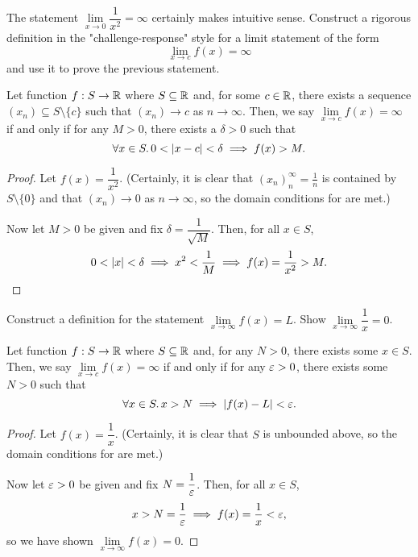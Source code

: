 \begin{problem}
  The statement $\lim\limits_{x \to 0} \dfrac{1}{x^{2}} = \infty$ certainly makes
  intuitive sense. Construct a rigorous definition in the "challenge-response"
  style for a limit statement of the form
    \[
      \lim_{x \to c} f(x) = \infty
    \]
  and use it to prove the previous statement.

  \begin{definition}
    \label{def:limit-to-infty-x-to-finite-real}
    Let function $f : S \to \mathbb{R}$ where $S \subseteq \mathbb{R}$ and, for some $c \in \mathbb{R}$, there exists a
    sequence $(x_{n}) \subseteq S \setminus \{ c \}$ such that $(x_{n}) \to c$ as $n \to \infty$.
    Then, we say $\lim\limits_{x \to c} f(x) = \infty$ if and only if for any
    $M > 0$, there exists a $\delta > 0$ such that
    \[
      \forall x \in S.\, 0 < \left\lvert x - c \right\rvert < \delta \implies f(x) > M.
    \]
  \end{definition}

  \begin{proof}
    Let $f(x) = \dfrac{1}{x^{2}}$. (Certainly, it is clear that
    $(x_{n})_{n}^{\infty} = \frac{1}{n}$ is contained by $S \setminus \{ 0 \}$
    and that $(x_{n}) \to 0$ as $n \to \infty$, so the domain conditions for 
     are met.)

    Now let $M > 0$ be given and fix $\delta = \dfrac{1}{\sqrt{M}}$. 
    Then, for all $x \in S$,
    \[
      0 < \left\lvert x \right\rvert < \delta \implies x^{2} < \frac{1}{M} \implies  f(x) = \frac{1}{x^{2}} > M.
    \]
  \end{proof}

\end{problem}

\begin{problem}
  Construct a definition for the statement $\lim\limits_{x \to \infty} f(x) = L$.
  Show $\lim\limits_{x \to \infty} \dfrac{1}{x} = 0$.

  \begin{definition}
    \label{def:limit-to-finite-real-x-to-infinite}
    Let function $f : S \to \mathbb{R}$ where $S \subseteq \mathbb{R}$ and, for any $N > 0$, there 
    exists some $x \in S$.
    Then, we say $\lim\limits_{x \to c} f(x) = \infty$ if and only if for any
    $\varepsilon > 0$, there exists some $N > 0$ such that
    \[
      \forall x \in S.\, x > N \implies \left\lvert f(x) - L \right\rvert < \varepsilon.
    \]
  \end{definition}

  \begin{proof}
    Let $f(x) = \dfrac{1}{x}$. (Certainly, it is clear that $S$ is unbounded
    above, so the domain conditions for
     are met.)

    Now let $\varepsilon > 0$ be given and fix $N = \dfrac{1}{\varepsilon}$. 
    Then, for all $x \in S$,
    \[
      x > N = \frac{1}{\varepsilon} \implies f(x) = \frac{1}{x} < \varepsilon,
    \]
    so we have shown $\lim\limits_{x \to \infty} f(x) = 0$.
  \end{proof}

\end{problem}

